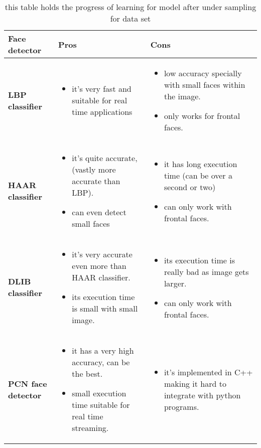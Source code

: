 \begin{table}[h!]
	\centering
	\begin{tabular}{m{3cm} | m{5cm} | m{5cm}}
		\textbf{Face detector} & \textbf{Pros} & \textbf{Cons}\\ \hline 
		\textbf{LBP classifier} 
		&
		\begin{itemize}
			\item it's very fast and suitable for real time applications 
		\end{itemize}

		& 
		\begin{itemize}
			\item low accuracy specially with small faces within the image.
			\item only works for frontal faces.
		\end{itemize}
		\\ \hline
		
		\textbf{HAAR classifier} 
		& 
		\begin{itemize}
			\item it's quite accurate, (vastly more accurate than LBP).
			\item can even detect small faces
		\end{itemize}
		& 
		\begin{itemize}
			\item it has long execution time (can be over a second or two)
			\item can only work with frontal faces.
		\end{itemize} 
		\\ \hline
		
		\textbf{DLIB classifier}
		& 
		\begin{itemize}
			\item it's very accurate even more than HAAR classifier.
			\item its execution time is small with small image.
		\end{itemize}
		& 
		\begin{itemize}
			\item its execution time is really bad as image gets larger.
			\item can only work with frontal faces.
		\end{itemize}
		\\ \hline
		\textbf{PCN face detector }
		& 
		\begin{itemize}
			\item it has a very high accuracy, can be the best.
			\item small execution time suitable for real time streaming.
		\end{itemize} 
		& 
		\begin{itemize}
			\item it's implemented in C++ making it hard to integrate with python programs.
		\end{itemize}
		\\
	\end{tabular}
	\caption{this table holds the progress of learning for model after under sampling for data set}
	\label{tab:facedetectors_compared}
\end{table}